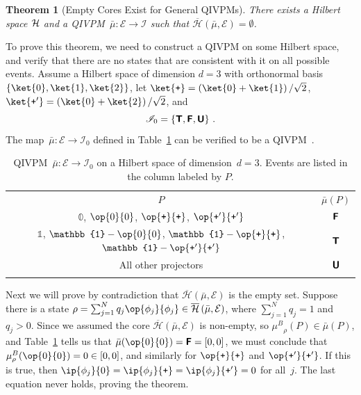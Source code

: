 \documentclass[english,reprint, aps, prl,superscriptaddress, showpacs,
showkeys, longbibliography, amsmath, amssymb, floatfix]{revtex4-1}
\theoremstyle{plain}
\newtheorem{thm}{Theorem}
\theoremstyle{definition}
\newcommand{\Hilb}{\mathcal{H}}
\newcommand{\events}{\ensuremath{\mathcal{E}}}
\newcommand{\imposs}{\textbf{\textsf{F}}}
\newcommand{\necess}{\textbf{\textsf{T}}}
\newcommand{\unknown}{\textbf{\textsf{U}}}
\newcommand{\proj}[1]{\op{#1}{#1}}
\newcommand{\ps}{\texttt{+}}
\newcommand{\coreBorn}{\ensuremath{\overline{\Hilb}}}
\newcommand{\muB}{\ensuremath{\mu^{B}}}
\begin{document}
\begin{thm}[Empty Cores Exist for General
  QIVPMs]\label{thm:Non-extensible-of-Gleason's}There exists a Hilbert
  space  ${\cal H}$ and a QIVPM~$\bar{\mu}:\events\rightarrow\mathscr{I}$ such
  that $\coreBorn\left(\bar{\mu},\events\right)=\emptyset$.\end{thm}

To prove this theorem, we need to construct a QIVPM on some Hilbert
space, and verify that there are no states that are consistent with it
on all possible events. Assume a Hilbert space of dimension $d=3$ with
orthonormal basis $\left\{ \ket{0},\ket{1},\ket{2}\right\} $, let
$\ket{\ps}=\left(\ket{0}+\ket{1}\right)/\sqrt{2}$,
$\ket{\ps'}=\left(\ket{0}+\ket{2}\right)/\sqrt{2}$, and
\begin{equation}
\mathscr{I}_{0}=\left\{ \necess,\imposs,\unknown\right\} \,.\label{eq:3-value-intervals}
\end{equation}
The map~$\bar{\mu}:\events\rightarrow\mathscr{I}_{0}$ defined in
Table~\ref{tab:non-Born-QIVPM} can be verified to be a
QIVPM~\cite{TaiThesis2018}.
\begin{table}
\caption{\label{tab:non-Born-QIVPM}QIVPM~$\bar{\mu}:\events\rightarrow\mathscr{I}_{0}$
on a Hilbert space of dimension~$d=3$. Events are listed in the column
labeled by $P$.}

\begin{tabular}{cc}
\toprule 
\addlinespace
$P$ & $\bar{\mu}\left(P\right)$\tabularnewline\addlinespace
\midrule
\midrule 
\addlinespace
$\mathbb{0}$, $\proj{0}$, $\proj{\ps}$, $\proj{\ps'}$ & $\imposs$\tabularnewline\addlinespace
\midrule 
\addlinespace
$\mathbb{1}$, $\mathbb{1}-\proj{0}$, $\mathbb{1}-\proj{\ps}$, 
$\mathbb{1}-\proj{\ps'}$ & $\necess$\tabularnewline\addlinespace
\midrule 
\addlinespace
All other projectors & $\unknown$\tabularnewline\addlinespace
\bottomrule
\end{tabular}
\end{table}
Next we will prove by contradiction that
$\coreBorn\left(\bar{\mu},\events\right)$ is the empty set. Suppose
there is a state
$\rho=\sum_{j=1}^{N}q_{j}\proj{\phi_{j}}\in\coreBorn\left(\bar{\mu},\events\right)$,
where $\sum_{j=1}^{N}q_{j}=1$ and $q_{j} > 0$. Since
we assumed the core $\coreBorn\left(\bar{\mu},\events\right)$ 
is non-empty, so  $\muB_{\rho}(P)\in\bar{\mu}(P)$, and 
Table~\ref{tab:non-Born-QIVPM} tells us that
$\bar{\mu}(\proj{0})=\imposs=[0,0]$, we must conclude that
$\muB_{\rho}(\proj{0})=0\in[0,0]$, and similarly for $\proj{\ps}$ and $\proj{\ps'}$.
If this is true, then $\ip{\phi_{j}}{0}=\ip{\phi_{j}}{\ps}=\ip{\phi_{j}}{\ps'}=0$
for all~$j$. The last equation never holds, proving the theorem.
\end{document}
